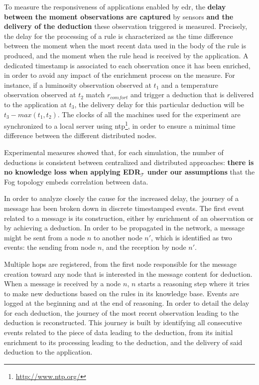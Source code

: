 \documentclass{iosart2c}
\newcommand{\edrt}{EDR$_{\mathcal{T}}$\xspace}
\begin{document}
To measure the responsiveness of applications enabled by \gls{edr}, the \textbf{delay between the moment observations are captured} by sensors \textbf{and the delivery of the deduction} these observation triggered is measured.
Precisely, the delay for the processing of a rule is characterized as the time difference between the moment when the most recent data used in the body of the rule is produced, and the moment when the rule head is received by the application.
A dedicated time\-stamp is associated to each observation once it has been enriched, in order to avoid any impact of the enrichment process on the measure.
For instance, if a luminosity observation observed at $t_{1}$ and a temperature observation observed at $t_{2}$ match $r_{comfort}$ and trigger a deduction that is delivered to the application at $t_{3}$, the delivery delay for this particular deduction will be $t_3 - max(t_1, t_2)$.
The clocks of all the machines used for the experiment are synchronized to a local server using \gls{ntp}\footnote{\url{http://www.ntp.org/}}, in order to ensure a minimal time difference between the different distributed nodes.

Experimental measures showed that, for each simulation, the number of deductions is consistent between centralized and distributed approaches: \textbf{there is no knowledge loss when applying \edrt under our assumptions} that the Fog topology embeds correlation between data.

In order to analyze closely the cause for the increased delay, the journey of a message has been broken down in discrete timestamped events. 
The first event related to a message is its construction, either by enrichment of an observation or by achieving a deduction.
In order to be propagated in the network, a message might be sent from a node $n$ to another node $n'$, which is identified as two events: the sending from node $n$, and the reception by node $n'$.

Multiple hops are registered, from the first node responsible for the message creation toward any node that is interested in the message content for deduction.
When a message is received by a node $n$, $n$ starts a reasoning step where it tries to make new deductions based on the rules in its knowledge base. 
Events are logged at the beginning and at the end of reasoning.
In order to detail the delay for each deduction, the journey of the most recent observation leading to the deduction is reconstructed.
This journey is built by identifying all consecutive events related to the piece of data leading to the deduction, from its initial enrichment to its processing leading to the deduction, and the delivery of said deduction to the application.
\end{document}
